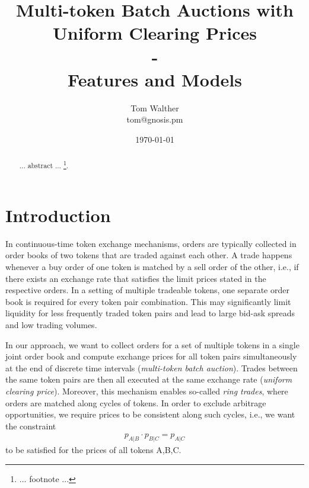 \documentclass[11pt,parskip=full]{scrartcl}%
\title{
  Multi-token Batch Auctions with Uniform Clearing Prices\\
  - \\
  \Large Features and Models}
\author{Tom Walther \\ tom@gnosis.pm}
\date{\today}
\newcommand*{\ie}{i.e., }
\begin{document}
\maketitle


\begin{abstract}
... abstract ...
\footnote{... footnote ...}.
\end{abstract}


\newpage
\tableofcontents

\newpage
\section{Introduction}
\label{sec:introduction}

In continuous-time token exchange mechanisms, orders are typically collected in order books of two
tokens that are traded against each other.
A trade happens whenever a buy order of one token is matched by a sell order of the other, \ie if
there exists an exchange rate that satisfies the limit prices stated in the respective orders.
In a setting of multiple tradeable tokens, one separate order book is required for every token pair
combination.
This may significantly limit liquidity for less frequently traded token pairs and lead to large
bid-ask spreads and low trading volumes.

In our approach, we want to collect orders for a set of multiple tokens in a single joint order
book and compute exchange prices for all token pairs simultaneously at the end of discrete time
intervals (\emph{multi-token batch auction}).
Trades between the same token pairs are then all executed at the same exchange rate (\emph{uniform
clearing price}).
Moreover, this mechanism enables so-called \emph{ring trades}, where orders are matched along
cycles of tokens.
In order to exclude arbitrage opportunities, we require prices to be consistent along such cycles,
\ie we want the constraint
\begin{align}
  p_{A|B} \cdot p_{B|C} = p_{A|C}
  \label{eq:arbitrage_freeness}
\end{align}
to be satisfied for the prices of all tokens A,B,C.
\end{document}
